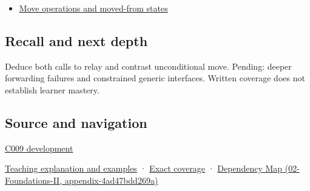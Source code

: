 \begin{itemize}
\tightlist
\item
  \hyperref[appendix-5636651017c2]{Move operations and moved-from states}
\end{itemize}

\subsection{Recall and next depth}\label{recall-and-next-depth}

Deduce both calls to relay and contrast unconditional move. Pending: deeper forwarding failures and constrained generic interfaces. Written coverage does not establish learner mastery.

\subsection{Source and navigation}\label{source-and-navigation}

\hyperref[appendix-fd090d982a15]{C009 development}

\href{Continuous\%20Notes/Computing\%20Foundations\%20-\%20From\%20Bits\%20to\%20C++\%20and\%20Systems\%20APIs\#Move\%20permission\%20is\%20not\%20resource\%20transfer}{Teaching explanation and examples} · \hyperref[appendix-fd090d982a15]{Exact coverage} · \href{}{Dependency Map (02-Foundations-II, appendix-4ad47bdd269a)}
